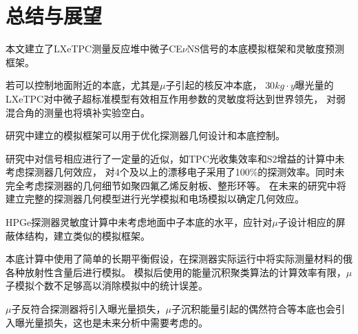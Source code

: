 
\chapter{总结与展望}

本文建立了LXeTPC测量反应堆中微子CE$\nu$NS信号的本底模拟框架和灵敏度预测框架。

若可以控制地面附近的本底，尤其是$\mu$子引起的核反冲本底，
$30\si{kg\cdot y}$曝光量的LXeTPC对中微子超标准模型有效相互作用参数的灵敏度将达到世界领先，
对弱混合角的测量也将填补实验空白。

研究中建立的模拟框架可以用于优化探测器几何设计和本底控制。

研究中对信号相应进行了一定量的近似，如TPC光收集效率和$\mathrm{S2}$增益的计算中未考虑探测器几何效应，
对4个及以上的漂移电子采用了100\%的探测效率。同时未完全考虑探测器的几何细节如聚四氟乙烯反射板、整形环等。
在未来的研究中将建立完整的探测器几何模型进行光学模拟和电场模拟以确定几何效应。

HPGe探测器灵敏度计算中未考虑地面中子本底的水平，应针对$\mu$子设计相应的屏蔽体结构，建立类似的模拟框架。

本底计算中使用了简单的长期平衡假设，在探测器实际运行中将实际测量材料的俄各种放射性含量后进行模拟。
模拟后使用的能量沉积聚类算法的计算效率有限，$\mu$子模拟个数不足够高以消除模拟中的统计误差。

$\mu$子反符合探测器将引入曝光量损失，$\mu$子沉积能量引起的偶然符合等本底也会引入曝光量损失，这也是未来分析中需要考虑的。
